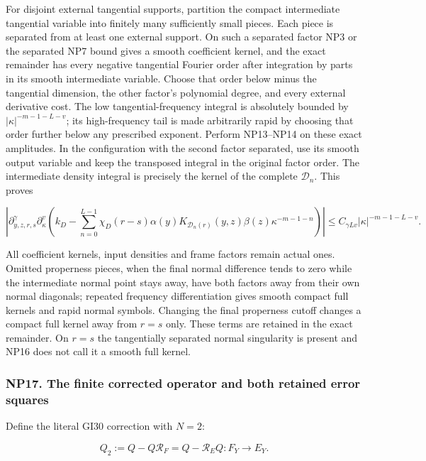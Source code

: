 \documentclass[
  11pt,
]{article}
\begin{document}
For disjoint external tangential supports, partition the compact
intermediate tangential variable into finitely many sufficiently small
pieces. Each piece is separated from at least one external support. On
such a separated factor NP3 or the separated NP7 bound gives a smooth
coefficient kernel, and the exact remainder has every negative
tangential Fourier order after integration by parts in its smooth
intermediate variable. Choose that order below minus the tangential
dimension, the other factor's polynomial degree, and every external
derivative cost. The low tangential-frequency integral is absolutely
bounded by \(|\kappa |^{-m-1-L-v}\); its high-frequency tail is made
arbitrarily rapid by choosing that order further below any prescribed
exponent. Perform NP13--NP14 on these exact amplitudes. In the
configuration with the second factor separated, use its smooth output
variable and keep the transposed integral in the original factor order.
The intermediate density integral is precisely the kernel of the
complete \(\mathcal D _n\). This proves

\[
 \boxed{\displaystyle
 \left|\partial_{y,z,r,s}^\gamma\partial_\kappa^v
 \left(k_D-\sum_{n=0}^{L-1}
       \chi_D(r-s)\alpha(y)K_{\mathcal D_n(r)}(y,z)\beta(z)
                         \kappa^{-m-1-n}\right)\right|
 \le C_{\gamma Lv}|\kappa|^{-m-1-L-v}.}
 \tag{NP16}
\]

All coefficient kernels, input densities and frame factors remain actual
ones. Omitted properness pieces, when the final normal difference tends
to zero while the intermediate normal point stays away, have both
factors away from their own normal diagonals; repeated frequency
differentiation gives smooth compact full kernels and rapid normal
symbols. Changing the final properness cutoff changes a compact full
kernel away from \(r=s\) only. These terms are retained in the exact
remainder. On \(r=s\) the tangentially separated normal singularity is
present and NP16 does not call it a smooth full kernel.

\subsubsection{NP17. The finite corrected operator and both retained
error
squares}\label{np17.-the-finite-corrected-operator-and-both-retained-error-squares}

Define the literal GI30 correction with \(N=2\):

\[
 Q_2:=Q-Q\mathcal R_F=Q-\mathcal R_EQ:F_Y\longrightarrow E_Y.
 \tag{NP17}
\]
\end{document}
